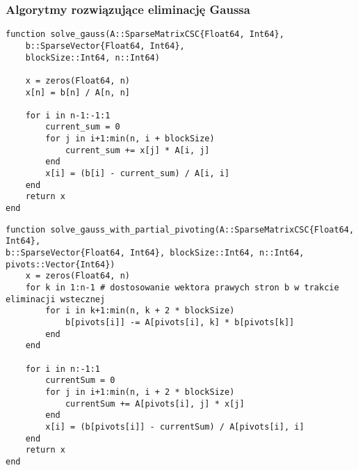 \documentclass{article}
\begin{document}
\subsubsection{Algorytmy rozwiązujące eliminację Gaussa}
\begin{verbatim}
function solve_gauss(A::SparseMatrixCSC{Float64, Int64},
    b::SparseVector{Float64, Int64},
    blockSize::Int64, n::Int64)
    
    x = zeros(Float64, n)
    x[n] = b[n] / A[n, n]

    for i in n-1:-1:1
        current_sum = 0
        for j in i+1:min(n, i + blockSize)
            current_sum += x[j] * A[i, j]
        end
        x[i] = (b[i] - current_sum) / A[i, i]
    end
    return x
end
\end{verbatim}
\newpage
\begin{verbatim}
function solve_gauss_with_partial_pivoting(A::SparseMatrixCSC{Float64, Int64}, 
b::SparseVector{Float64, Int64}, blockSize::Int64, n::Int64, pivots::Vector{Int64})
    x = zeros(Float64, n)
    for k in 1:n-1 # dostosowanie wektora prawych stron b w trakcie eliminacji wstecznej
        for i in k+1:min(n, k + 2 * blockSize)
            b[pivots[i]] -= A[pivots[i], k] * b[pivots[k]]
        end
    end

    for i in n:-1:1
        currentSum = 0
        for j in i+1:min(n, i + 2 * blockSize)
            currentSum += A[pivots[i], j] * x[j]
        end
        x[i] = (b[pivots[i]] - currentSum) / A[pivots[i], i]
    end
    return x
end
\end{verbatim}
\vspace{5pt}
\end{document}
